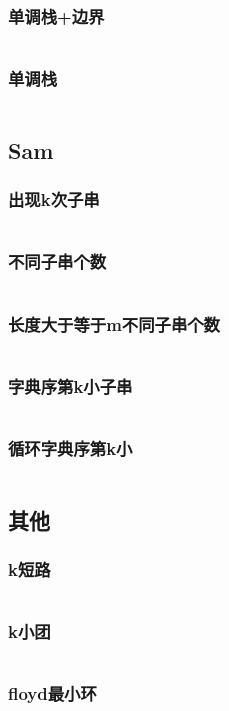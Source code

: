 \documentclass[a4paper,12pt]{article}
\begin{document}
\subsubsection{单调栈+边界}
\inputminted[]{c++}{code/cf432D.cpp}
\subsubsection{单调栈}
\inputminted[]{c++}{code/poj3415.cpp}
\subsection{Sam}
\subsubsection{出现k次子串}
\inputminted[]{c++}{code/hdu6194.cpp}
\subsubsection{不同子串个数}
\inputminted[]{c++}{code/luoguP2408.cpp}
\subsubsection{长度大于等于m不同子串个数}
\inputminted[]{c++}{code/nc551C.cpp}
\subsubsection{字典序第k小子串}
\inputminted[]{c++}{code/luoguP3975.cpp}
\subsubsection{循环字典序第k小}
\inputminted[]{c++}{code/luoguP1368.cpp}
\subsection{其他}
\subsubsection{k短路}
\inputminted[]{c++}{code/hdu6705.cpp}
\subsubsection{k小团}
\inputminted[]{c++}{code/nc882D.cpp}
\subsubsection{floyd最小环}
\inputminted[]{c++}{code/cf1205B.cpp}
\end{document}
